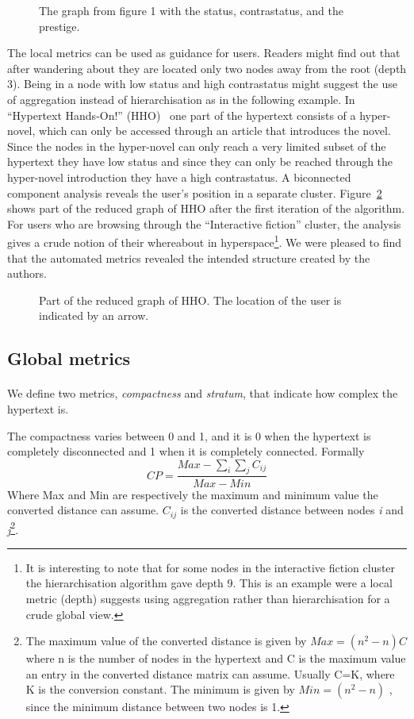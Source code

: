 \documentclass[twocolumn,10pt]{article}
\begin{document}
\begin{figure}
\vspace*{8cm}
\caption [10pt] { The graph from figure 1 with the status, contrastatus,
and the prestige.}
\label{fig:prest}
\end{figure}

The local metrics can be used as guidance for users. Readers might
find out that after wandering about they are located only two nodes
away from the root (depth 3). Being in a node with low status and high
contrastatus might suggest the use of aggregation instead of
hierarchisation as in the following example.  In ``Hypertext
Hands-On!'' (HHO)~\cite{shn89} one part of the hypertext consists of a
hyper-novel, which can only be accessed through an article that
introduces the novel. Since the nodes in the hyper-novel can only
reach a very limited subset of the hypertext they have low status and
since they can only be reached through the hyper-novel introduction
they have a high contrastatus. A biconnected component analysis
reveals the user's position in a separate cluster.
Figure~\ref{fig:hho} shows part of the reduced graph of HHO after the
first iteration of the algorithm. For users who are browsing through
the ``Interactive fiction'' cluster, the analysis gives a crude notion
of their whereabout in hyperspace\footnote{It is interesting to
note that for some nodes in the interactive fiction cluster the
hierarchisation algorithm gave depth 9. This is an example were a
local metric (depth) suggests using aggregation rather than
hierarchisation for a crude global view.}.  We were pleased to find
that the automated metrics revealed the intended structure created by
the authors.

\begin{figure}
\vspace*{8cm}
\caption [10pt] {Part of the reduced graph of HHO. 
The location of the user is 
indicated by an arrow.}
\label{fig:hho}
\end{figure}


\subsection*{Global metrics}
\paragraph{}
We define two metrics, {\em compactness} and {\em stratum}, that indicate how
complex the hypertext is.

The compactness varies between 0 and 1, and it is 0 when the hypertext
is completely disconnected and 1 when it is completely connected.
Formally
\[
CP = \frac {Max - \sum_{i} \sum_{j} C_{ij}} {Max - Min}
\]
Where Max and Min are respectively the maximum and minimum value the converted 
distance can assume. $C_{ij}$ is the converted distance between nodes {\em i}
and {\em j}\footnote{ The maximum value of the converted distance is given by
$Max = (n^{2} - n) C $  where n is the number of nodes in the hypertext
and C is the maximum value an entry in the converted distance matrix can assume.
Usually C=K, where K is the conversion constant.
The minimum is given by $Min = (n^{2} - n) $ , since the minimum distance
between two nodes is 1.}.
\end{document}
